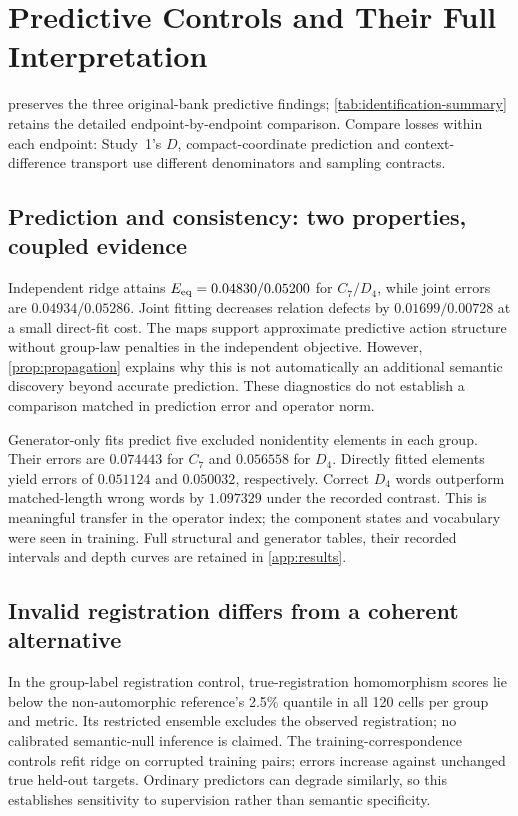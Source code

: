 \section{Predictive Controls and Their Full Interpretation}
\label{app:predictive-controls}
 preserves the three original-bank predictive findings; \cref{tab:identification-summary} retains the detailed endpoint-by-endpoint comparison. Compare losses within each endpoint: Study~1's $D$, compact-coordinate prediction and context-difference transport use different denominators and sampling contracts.



\subsection{Prediction and consistency: two properties, coupled evidence}
Independent ridge attains $E_{\mathrm{eq}}=0.04830/0.05200$ for $C_7/D_4$, while joint errors are $0.04934/0.05286$. Joint fitting decreases relation defects by $0.01699/0.00728$ at a small direct-fit cost. The maps support approximate predictive action structure without group-law penalties in the independent objective. However, \cref{prop:propagation} explains why this is not automatically an additional semantic discovery beyond accurate prediction. These diagnostics do not establish a comparison matched in prediction error and operator norm.

Generator-only fits predict five excluded nonidentity elements in each group. Their errors are $0.074443$ for $C_7$ and $0.056558$ for $D_4$. Directly fitted elements yield errors of $0.051124$ and $0.050032$, respectively. Correct $D_4$ words outperform matched-length wrong words by $1.097329$ under the recorded contrast. This is meaningful transfer in the operator index; the component states and vocabulary were seen in training. Full structural and generator tables, their recorded intervals and depth curves are retained in \cref{app:results}.

\subsection{Invalid registration differs from a coherent alternative}
In the group-label registration control, true-registration homomorphism scores lie below the non-automorphic reference's 2.5\% quantile in all 120 cells per group and metric. Its restricted ensemble excludes the observed registration; no calibrated semantic-null inference is claimed. The training-correspondence controls refit ridge on corrupted training pairs; errors increase against unchanged true held-out targets. Ordinary predictors can degrade similarly, so this establishes sensitivity to supervision rather than semantic specificity.

